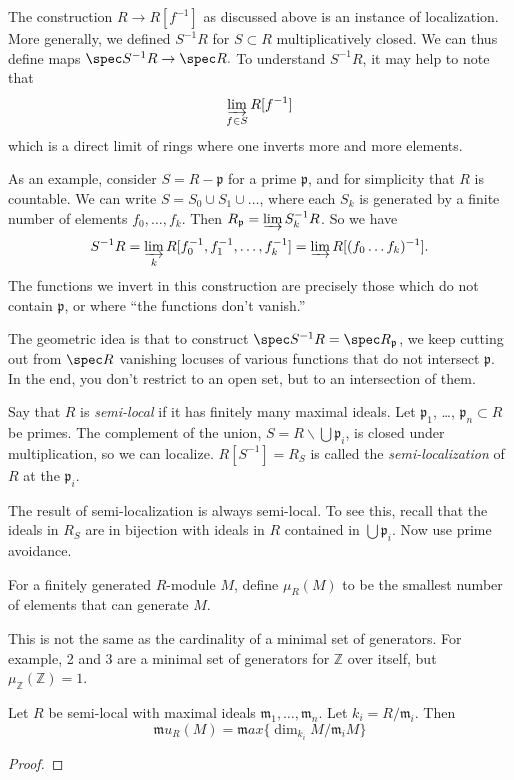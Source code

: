 \begin{remark} 
The construction $R \to R[f^{-1}]$ as discussed above is an
instance of
localization. More generally, we defined $S^{-1}R$ for $S
\subset R$
multiplicatively closed. We can thus define maps
\( \spec S^{-1}R \to \spec R . \)
To understand $S^{-1}R$, it may help to note that
\[ \varinjlim_{f \in S} R[f^{-1}]  \]
which is a direct limit of rings where one inverts more and more elements.

As an example, consider $S = R - \mathfrak{p}$ for a prime
$\mathfrak{p}$, and for
simplicity that $R$ is countable. We can write $S =
S_0 \cup S_1 \cup \dots$, where each $S_k$ is generated by a
finite number of
elements $f_0, \dots, f_k$. Then $R_{\mathfrak{p}} = \varinjlim
S_k^{-1} R$.
So we have
\[ S^{-1}R = \varinjlim_k R[f_0^{-1} , f_1^{-1}, \dots, f_k^{-1}
] = \varinjlim
R[(f_0\dots f_k)^{-1}]. \]
The functions we invert in this construction are precisely those
which do not
contain $\mathfrak{p}$, or where ``the functions don't vanish.''

The geometric idea is
that to construct $\spec S^{-1}R = \spec R_{\mathfrak{p}}$, we
keep cutting out
from $\spec R$ vanishing locuses of various functions that do
not
intersect $\mathfrak{p}$. In the end, you don't restrict to an
open set, but
to an intersection of them.
\end{remark} 
\begin{exercise} \label{semilocal} 
Say that    $R$ is \emph{semi-local} if it has finitely many maximal ideals.
Let $\mathfrak{p}_1$, \dots, $\mathfrak{p}_n\subset R$ be primes. The complement of
the union, $S=R\smallsetminus \bigcup \mathfrak{p}_i$, is closed under
multiplication, so we can
 localize. $R[S^{-1}] = R_S$ is called the \emph{semi-localization}
  of $R$ at the $\mathfrak{p}_i$.
 
The result of semi-localization is always semi-local. To see this, recall that
the ideals
 in $R_S$ are in bijection with ideals in $R$ contained in $\bigcup
 \mathfrak{p}_i$. Now use prime avoidance.
\end{exercise}

\begin{definition}
For a finitely generated $R$-module $M$, define $\mu_R(M)$ to be the smallest
number
   of elements that can generate $M$.
 \end{definition}
This is not the same as the cardinality of a minimal set of generators. For
example, 2
and 3 are a minimal set of generators for $\mathbb{Z}$ over itself, but
$\mu_\mathbb{Z} (\mathbb{Z}) =1$.

 \begin{theorem}
Let $R$ be semi-local with maximal ideals $\mathfrak{m}_1,\dots,
\mathfrak{m}_n$. Let $k_i = R/\mathfrak{m}_i$. Then
   \[
     \mathfrak{m}u_R(M) = \mathfrak{m}ax \{\dim_{k_i} M/\mathfrak{m}_i M\}
   \]
 \end{theorem}
\begin{proof} 
\end{proof} 

